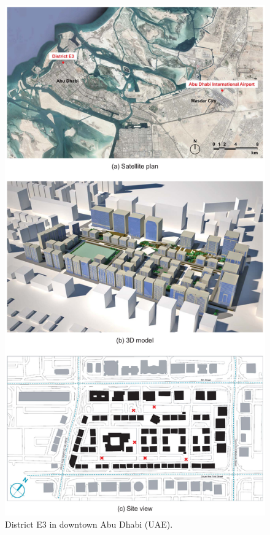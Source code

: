 \begin{figure}
\centering
\includegraphics[width=.73\linewidth,trim=1 1 1 1,clip]{DistrictE3.pdf}
\caption{District E3 in downtown Abu Dhabi (UAE).}
\end{figure}

